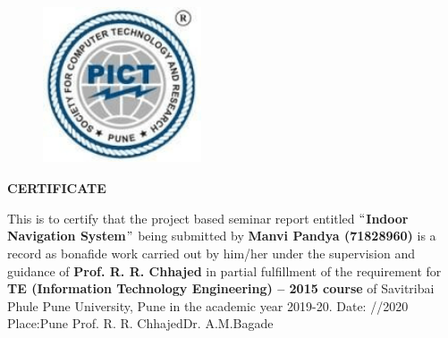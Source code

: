 \documentclass[a4paper, 12pt]{article}
\begin{document}
\begin{titlepage}
\begin{figure}[H]
    \centering
		\includegraphics[width=1.84in,height=1.84in]{Pict_logo.png}
\end{figure}
\begin{center}
\textbf{{\LARGE CERTIFICATE}}
\end{center}

This is to certify that the project based seminar report entitled
\textbf{\textcolor[HTML]{FF0000}{$``$Indoor Navigation System$"$ }} being submitted by \textbf{\textcolor[HTML]{FF0000}{Manvi Pandya  (71828960)}} is a record as bonafide work carried out by him/her under the supervision and guidance of \textbf{\textcolor[HTML]{FF0000}{Prof. R. R. Chhajed}} in partial fulfillment
of the requirement for \textbf{TE (Information Technology Engineering) -- 2015 
course} of Savitribai Phule Pune University, Pune in the academic year 2019-20.
\linebreak
\linebreak
\linebreak
\linebreak
\linebreak
\linebreak
\linebreak
\linebreak
\linebreak
Date:\hspace{15pt} /\hspace{15pt}/2020\hspace{400pt}
\linebreak
\linebreak
Place:\hspace{15pt}Pune\hspace{15pt}\hspace{15pt}\hspace{15pt}\hspace{15pt}\hspace{15pt}\hspace{15pt}\hspace{15pt}\hspace{15pt}
\linebreak
\linebreak
\textcolor[HTML]{FF0000}{Prof. R. R. Chhajed}\hspace{200pt}\textcolor[HTML]{FF0000}{Dr. A.M.Bagade}


\end{titlepage}
\end{document}
